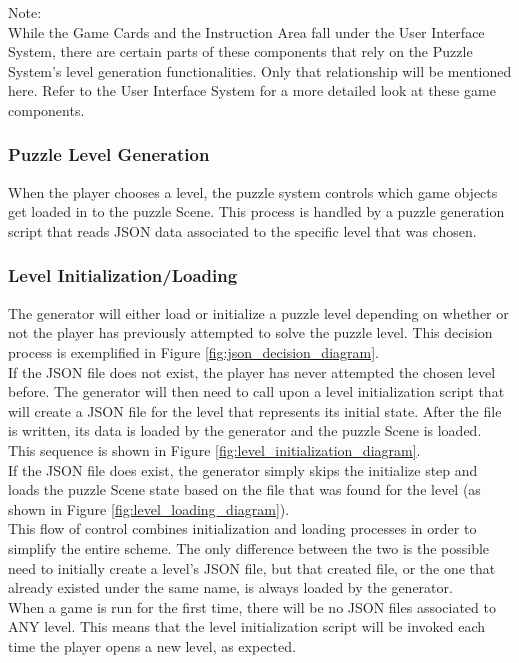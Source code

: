 Note:\\
While the Game Cards and the Instruction Area fall under the User
Interface System, there are certain parts of these components that rely on
the Puzzle System’s level generation functionalities. Only that relationship
will be mentioned here. Refer to the User Interface System for a more detailed
look at these game components.

\subsubsection{Puzzle Level Generation}
When the player chooses a level, the puzzle system controls
which game objects get loaded in to the puzzle Scene. This process is handled
by a puzzle generation script that reads JSON data associated to the specific
level that was chosen.

\subsubsection{Level Initialization/Loading}
The generator will either load or initialize a puzzle level depending on whether
or not the player has previously attempted to solve the puzzle level. This
decision process is exemplified in Figure \ref{fig:json_decision_diagram}.\\

If the JSON file does not exist, the player has never attempted the chosen level before. The
generator will then need to call upon a level initialization script that will
create a JSON file for the level that represents its initial state. After the file
is written, its data is loaded by the generator and the puzzle Scene is loaded.
This sequence is shown in Figure \ref{fig:level_initialization_diagram}.\\

If the JSON file does exist, the generator simply skips the initialize step and
loads the puzzle Scene state based on the file that was found for the level (as
shown in Figure \ref{fig:level_loading_diagram}).\\

This flow of control combines initialization and loading processes in order to simplify
the entire scheme. The only difference between the two is the possible need to
initially create a level's JSON file, but that created file, or the one that already
existed under the same name, is always loaded by the generator.\\

When a game is run for the first time, there will be no JSON files associated to
ANY level. This means that the level initialization script will be invoked each time
the player opens a new level, as expected.\\

